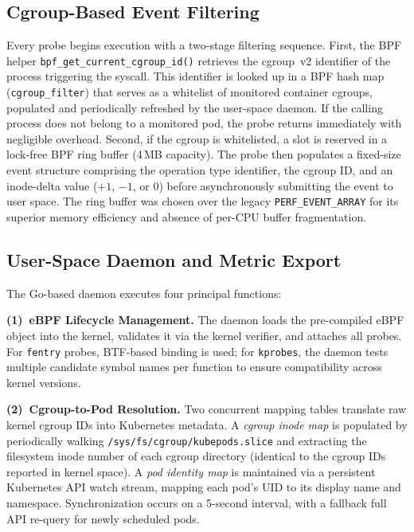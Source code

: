 \documentclass[conference]{IEEEtran}
\begin{document}
\subsection{Cgroup-Based Event Filtering}
\label{subsec:filtering}

Every probe begins execution with a two-stage filtering sequence. First, the BPF helper \texttt{bpf\_get\_current\_cgroup\_id()} retrieves the cgroup~v2 identifier of the process triggering the syscall. This identifier is looked up in a BPF hash map (\texttt{cgroup\_filter}) that serves as a whitelist of monitored container cgroups, populated and periodically refreshed by the user-space daemon. If the calling process does not belong to a monitored pod, the probe returns immediately with negligible overhead. Second, if the cgroup is whitelisted, a slot is reserved in a lock-free BPF ring buffer (4\,MB capacity). The probe then populates a fixed-size event structure comprising the operation type identifier, the cgroup ID, and an inode-delta value ($+1$, $-1$, or $0$) before asynchronously submitting the event to user space. The ring buffer was chosen over the legacy \texttt{PERF\_EVENT\_ARRAY} for its superior memory efficiency and absence of per-CPU buffer fragmentation.


\subsection{User-Space Daemon and Metric Export}
\label{subsec:daemon}

The Go-based daemon executes four principal functions:

\textbf{(1)~eBPF Lifecycle Management.} The daemon loads the pre-compiled eBPF object into the kernel, validates it via the kernel verifier, and attaches all probes. For \texttt{fentry} probes, BTF-based binding is used; for \texttt{kprobes}, the daemon tests multiple candidate symbol names per function to ensure compatibility across kernel versions.

\textbf{(2)~Cgroup-to-Pod Resolution.} Two concurrent mapping tables translate raw kernel cgroup IDs into Kubernetes metadata. A \emph{cgroup inode map} is populated by periodically walking \texttt{/sys/fs/cgroup/kubepods.slice} and extracting the filesystem inode number of each cgroup directory (identical to the cgroup IDs reported in kernel space). A \emph{pod identity map} is maintained via a persistent Kubernetes API watch stream, mapping each pod's UID to its display name and namespace. Synchronization occurs on a 5-second interval, with a fallback full API re-query for newly scheduled pods.
\end{document}
